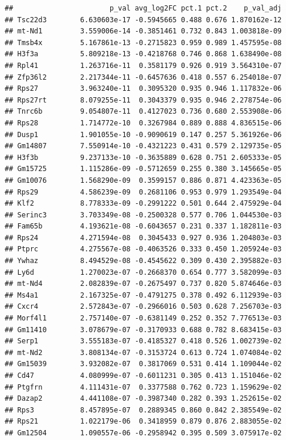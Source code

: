 \documentclass[
]{article}
\begin{document}
\begin{verbatim}
##                       p_val avg_log2FC pct.1 pct.2    p_val_adj
## Tsc22d3        6.630603e-17 -0.5945665 0.488 0.676 1.870162e-12
## mt-Nd1         3.559006e-14 -0.3851461 0.732 0.843 1.003818e-09
## Tmsb4x         5.167861e-13 -0.2715823 0.959 0.989 1.457595e-08
## H3f3a          5.809218e-13 -0.4218768 0.746 0.868 1.638490e-08
## Rpl41          1.263716e-11  0.3581179 0.926 0.919 3.564310e-07
## Zfp36l2        2.217344e-11 -0.6457636 0.418 0.557 6.254018e-07
## Rps27          3.963240e-11  0.3095320 0.935 0.946 1.117832e-06
## Rps27rt        8.079255e-11  0.3043379 0.935 0.946 2.278754e-06
## Tnrc6b         9.054807e-11  0.4127023 0.736 0.680 2.553908e-06
## Rps28          1.714772e-10  0.3267984 0.889 0.888 4.836515e-06
## Dusp1          1.901055e-10 -0.9090619 0.147 0.257 5.361926e-06
## Gm14807        7.550914e-10 -0.4321223 0.431 0.579 2.129735e-05
## H3f3b          9.237133e-10 -0.3635889 0.628 0.751 2.605333e-05
## Gm15725        1.115286e-09 -0.5712659 0.255 0.380 3.145665e-05
## Gm10076        1.568290e-09  0.3599157 0.886 0.871 4.423363e-05
## Rps29          4.586239e-09  0.2681106 0.953 0.979 1.293549e-04
## Klf2           8.778333e-09 -0.2991222 0.501 0.644 2.475929e-04
## Serinc3        3.703349e-08 -0.2500328 0.577 0.706 1.044530e-03
## Fam65b         4.193621e-08 -0.6043657 0.231 0.337 1.182811e-03
## Rps24          4.271594e-08  0.3045433 0.927 0.936 1.204803e-03
## Ptprc          4.275567e-08 -0.4063526 0.333 0.450 1.205924e-03
## Ywhaz          8.494529e-08 -0.4545622 0.309 0.430 2.395882e-03
## Ly6d           1.270023e-07 -0.2668370 0.654 0.777 3.582099e-03
## mt-Nd4         2.082839e-07 -0.2675497 0.737 0.820 5.874646e-03
## Ms4a1          2.167325e-07 -0.4791275 0.378 0.492 6.112939e-03
## Cxcr4          2.572843e-07 -0.2966016 0.503 0.628 7.256703e-03
## Morf4l1        2.757140e-07 -0.6381149 0.252 0.352 7.776513e-03
## Gm11410        3.078679e-07 -0.3170933 0.688 0.782 8.683415e-03
## Serp1          3.555183e-07 -0.4185327 0.418 0.526 1.002739e-02
## mt-Nd2         3.808134e-07 -0.3153724 0.613 0.724 1.074084e-02
## Gm15039        3.932082e-07  0.3817069 0.531 0.414 1.109044e-02
## Cd47           4.080999e-07 -0.6011231 0.305 0.413 1.151046e-02
## Ptgfrn         4.111431e-07  0.3377588 0.762 0.723 1.159629e-02
## Dazap2         4.441108e-07 -0.3987340 0.282 0.393 1.252615e-02
## Rps3           8.457895e-07  0.2889345 0.860 0.842 2.385549e-02
## Rps21          1.022179e-06  0.3418959 0.879 0.876 2.883055e-02
## Gm12504        1.090557e-06 -0.2958942 0.395 0.509 3.075917e-02

\end{verbatim}
\end{document}
